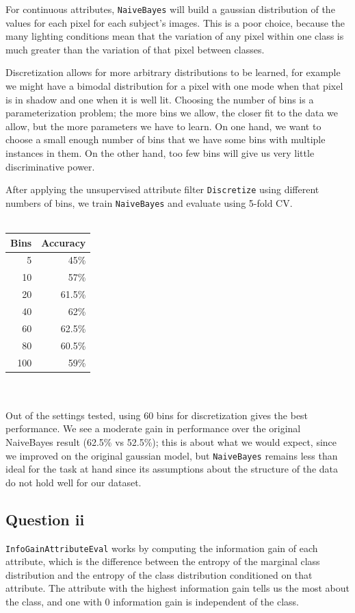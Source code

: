 \documentclass[a4paper]{article}
\begin{document}
For continuous attributes, {\tt NaiveBayes} will build a gaussian distribution of the values for each pixel for each subject's images. This is a poor choice, because the many lighting conditions mean that the variation of any pixel within one class is much greater than the variation of that pixel between classes.

Discretization allows for more arbitrary distributions to be learned, for example we might have a bimodal distribution for a pixel with one mode when that pixel is in shadow and one when it is well lit. Choosing the number of bins is a parameterization problem; the more bins we allow, the closer fit to the data we allow, but the more parameters we have to learn. On one hand, we want to choose a small enough number of bins that we have some bins with multiple instances in them. On the other hand, too few bins will give us very little discriminative power.

After applying the unsupervised attribute filter {\tt Discretize} using different numbers of bins, we train {\tt NaiveBayes} and evaluate using 5-fold CV.\\
\\
\begin{tabular}{rr}
Bins & Accuracy\\
\hline
5 & 45\% \\
10 & 57\% \\
20 & 61.5\% \\
40 & 62\% \\
60 & 62.5\% \\
80 & 60.5\% \\
100 & 59\%
\end{tabular}\\
\\
Out of the settings tested, using 60 bins for discretization gives the best performance. We see a moderate gain in performance over the original NaiveBayes result (62.5\% vs 52.5\%); this is about what we would expect, since we improved on the original gaussian model, but {\tt NaiveBayes} remains less than ideal for the task at hand since its assumptions about the structure of the data do not hold well for our dataset.

\subsection*{Question ii}
{\tt InfoGainAttributeEval} works by computing the information gain of each attribute, which is the difference between the entropy of the marginal class distribution and the entropy of the class distribution conditioned on that attribute. The attribute with the highest information gain tells us the most about the class, and one with 0 information gain is independent of the class.
\end{document}
